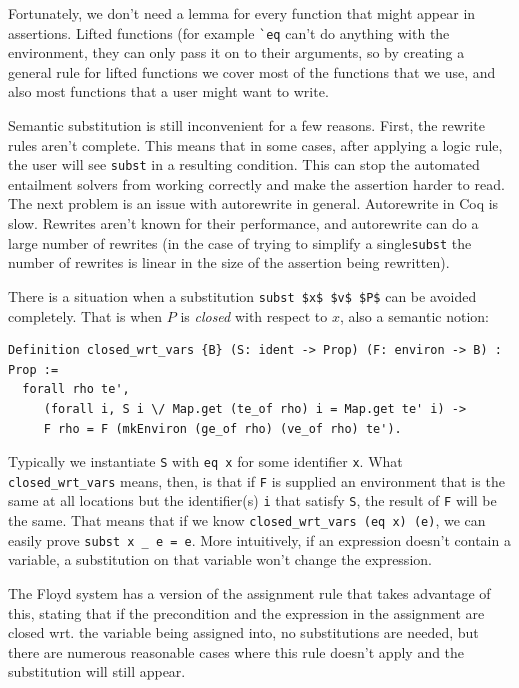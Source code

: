 \documentclass{puthesis}
\begin{document}
Fortunately, we don't need a lemma for every function that might
appear in assertions. Lifted functions (for example \lstinline|`eq|
can't do anything with the environment, they can only pass it on to
their arguments, so by creating a general rule for lifted functions we
cover most of the functions that we use, and also most functions that
a user might want to write.

Semantic substitution is still inconvenient for a few reasons. First,
the rewrite rules aren't complete. This means that in some cases,
after applying a logic rule, the user will see \lstinline|subst| in a
resulting condition. This can stop the automated entailment solvers
from working correctly and make the assertion harder to read. The next
problem is an issue with autorewrite in general.  Autorewrite in Coq
is slow. Rewrites aren't known for their performance, and autorewrite
can do a large number of rewrites (in the case of trying to simplify a
single\lstinline|subst| the number of rewrites is linear in the size
of the assertion being rewritten).

There is a situation when a substitution \lstinline|subst $x$ $v$ $P$| can
be avoided completely. That is when $P$ is \emph{closed} with respect to 
$x$, also a semantic notion:

\begin{lstlisting}
Definition closed_wrt_vars {B} (S: ident -> Prop) (F: environ -> B) : Prop := 
  forall rho te',  
     (forall i, S i \/ Map.get (te_of rho) i = Map.get te' i) ->
     F rho = F (mkEnviron (ge_of rho) (ve_of rho) te').
\end{lstlisting}

Typically we instantiate \lstinline|S| with \lstinline|eq x| for some
identifier \lstinline|x|.  What \lstinline|closed_wrt_vars| means,
then, is that if \lstinline|F| is supplied an environment that is the
same at all locations but the identifier(s) \lstinline|i| that satisfy
\lstinline|S|, the result of \lstinline|F| will be the same. That
means that if we know \lstinline|closed_wrt_vars (eq x) (e)|, we can
easily prove \lstinline|subst x _ e = e|. More intuitively, if an
expression doesn't contain a variable, a substitution on that variable
won't change the expression.

The Floyd system has a version of the assignment rule that takes
advantage of this, stating that if the precondition and the expression
in the assignment are closed wrt. the variable being assigned into, no
substitutions are needed, but there are numerous reasonable cases
where this rule doesn't apply and the substitution will still appear.
\end{document}
